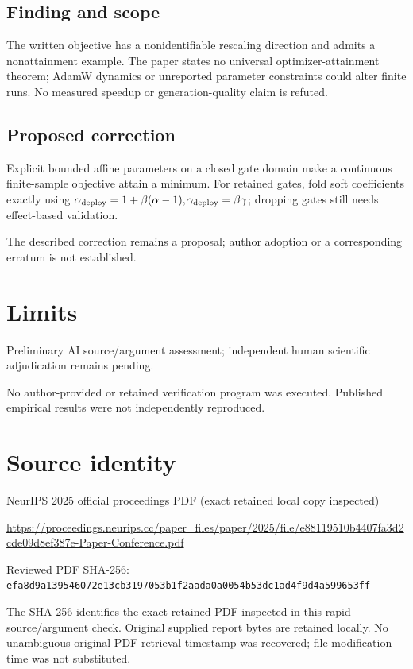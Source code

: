 \documentclass[11pt]{article}
\begin{document}
\subsection*{Finding and scope}

The written objective has a nonidentifiable rescaling direction and admits a nonattainment example. The paper states no universal optimizer-attainment theorem; AdamW dynamics or unreported parameter constraints could alter finite runs. No measured speedup or generation-quality claim is refuted.

\subsection*{Proposed correction}

Explicit bounded affine parameters on a closed gate domain make a continuous finite-sample objective attain a minimum. For retained gates, fold soft coefficients exactly using \(\alpha_{\rm deploy}=1+\beta(\alpha-1),\gamma_{\rm deploy}=\beta\gamma\); dropping gates still needs effect-based validation.

The described correction remains a proposal; author adoption or a corresponding erratum is not established.

\section*{Limits}

Preliminary AI source/argument assessment; independent human scientific adjudication remains pending.\par

No author-provided or retained verification program was executed. Published empirical results were not independently reproduced.\par

\section*{Source identity}

NeurIPS 2025 official proceedings PDF (exact retained local copy inspected)

\url{https://proceedings.neurips.cc/paper_files/paper/2025/file/e88119510b4407fa3d2cde09d8ef387e-Paper-Conference.pdf}

Reviewed PDF SHA-256: \nolinkurl{efa8d9a139546072e13cb3197053b1f2aada0a0054b53dc1ad4f9d4a599653ff}

The SHA-256 identifies the exact retained PDF inspected in this rapid source/argument check. Original supplied report bytes are retained locally. No unambiguous original PDF retrieval timestamp was recovered; file modification time was not substituted.
\end{document}
